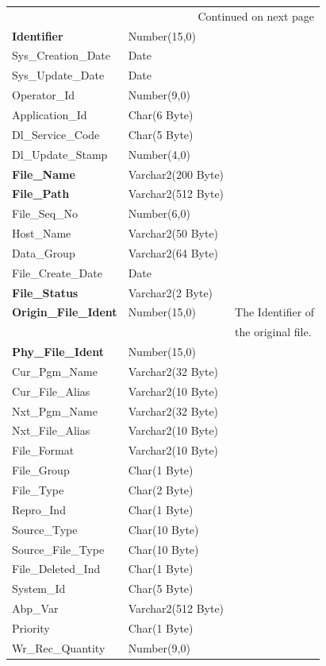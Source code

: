 \documentclass[12pt,twoside]{article}
\begin{document}
\begin{longtable}{l|l|l}
\hline
\endhead
\hline\multicolumn{3}{r}{Continued on next page} \\
\endfoot
\endlastfoot
\hline
\textbf{Identifier} & Number(15,0) & \\
Sys\_Creation\_Date & Date & \\
Sys\_Update\_Date & Date & \\
Operator\_Id & Number(9,0) & \\
Application\_Id & Char(6 Byte) & \\
Dl\_Service\_Code & Char(5 Byte) & \\
Dl\_Update\_Stamp & Number(4,0) & \\
\textbf{File\_Name} & Varchar2(200 Byte) & \\
\textbf{File\_Path} & Varchar2(512 Byte) & \\
File\_Seq\_No & Number(6,0) & \\
Host\_Name & Varchar2(50 Byte) & \\
Data\_Group & Varchar2(64 Byte) & \\
File\_Create\_Date & Date & \\
\textbf{File\_Status} & Varchar2(2 Byte) & \\
\textbf{Origin\_File\_Ident} & Number(15,0) & The Identifier of\\
 &  & the original file.\\
\textbf{Phy\_File\_Ident} & Number(15,0) & \\
Cur\_Pgm\_Name & Varchar2(32 Byte) & \\
Cur\_File\_Alias & Varchar2(10 Byte) & \\
Nxt\_Pgm\_Name & Varchar2(32 Byte) & \\
Nxt\_File\_Alias & Varchar2(10 Byte) & \\
File\_Format & Varchar2(10 Byte) & \\
File\_Group & Char(1 Byte) & \\
File\_Type & Char(2 Byte) & \\
Repro\_Ind & Char(1 Byte) & \\
Source\_Type & Char(10 Byte) & \\
Source\_File\_Type & Char(10 Byte) & \\
File\_Deleted\_Ind & Char(1 Byte) & \\
System\_Id & Char(5 Byte) & \\
Abp\_Var & Varchar2(512 Byte) & \\
Priority & Char(1 Byte) & \\
Wr\_Rec\_Quantity & Number(9,0) & \\

\end{longtable}
\end{document}
